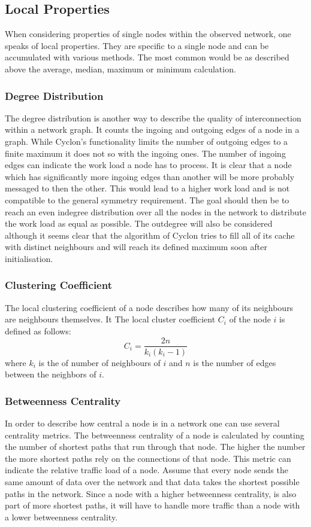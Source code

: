 \subsection{Local Properties}
When considering properties of single nodes within the observed network, one
speaks of local properties. They are specific to a single node and can be
accumulated with various methods. The most common would be as described above
the average, median, maximum or minimum calculation. 
\subsubsection{Degree Distribution}
The degree distribution is another way to describe the quality of
interconnection within a network graph. It counts the ingoing and outgoing edges
of a node in a graph. While Cyclon's functionality limits the number of outgoing
edges to a finite maximum it does not so with the ingoing ones. The number of
ingoing edges can indicate the work load a node has to process. It is clear that
a node which has significantly more ingoing edges than another will be more
probably messaged to then the other. This would lead to a higher work load and
is not compatible to the general symmetry requirement. The goal should then be
to reach an even indegree distribution over all the nodes in the network to
distribute the work load as equal as possible. The outdegree will also be
considered although it seems clear that the algorithm of Cyclon tries to fill
all of its cache with distinct neighbours and will reach its defined maximum
soon after initialisation.
\subsubsection{Clustering Coefficient}
The local clustering coefficient of a node describes how many of its neighbours
are neighbours themselves. It  The local cluster coefficient $C_i$ of the node
$i$ is defined as follows:
\[C_i = \frac{2n}{k_i(k_i-1)}\]
where $k_i$ is the of number of neighbours of $i$ and $n$ is the number of edges
between the neighbors of $i$.
\subsubsection{Betweenness Centrality}
In order to describe how central a node is in a network one can use several
centrality metrics. The betweenness centrality of a node is calculated by
counting the number of shortest paths that run through that node. The higher the
number the more shortest paths rely on the connections of that node. This metric
can indicate the relative traffic load of a node. Assume that every node sends
the same amount of data over the network and that data takes the shortest
possible paths in the network. Since a node with a higher betweenness
centrality, is also part of more shortest paths, it will have to handle more
traffic than a node with a lower betweenness centrality. 

